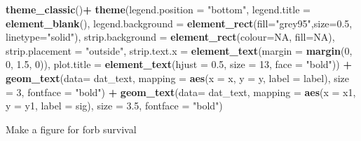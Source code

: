 \documentclass[
]{article}
\newenvironment{Shaded}{\begin{snugshade}}{\end{snugshade}}
\newcommand{\DataTypeTok}[1]{\textcolor[rgb]{0.13,0.29,0.53}{#1}}
\newcommand{\DecValTok}[1]{\textcolor[rgb]{0.00,0.00,0.81}{#1}}
\newcommand{\FloatTok}[1]{\textcolor[rgb]{0.00,0.00,0.81}{#1}}
\newcommand{\KeywordTok}[1]{\textcolor[rgb]{0.13,0.29,0.53}{\textbf{#1}}}
\newcommand{\NormalTok}[1]{#1}
\newcommand{\OperatorTok}[1]{\textcolor[rgb]{0.81,0.36,0.00}{\textbf{#1}}}
\newcommand{\OtherTok}[1]{\textcolor[rgb]{0.56,0.35,0.01}{#1}}
\newcommand{\StringTok}[1]{\textcolor[rgb]{0.31,0.60,0.02}{#1}}
\begin{document}
\begin{Shaded}
\begin{Highlighting}[]
\StringTok{  }\KeywordTok{theme\_classic}\NormalTok{()}\OperatorTok{+}
\StringTok{  }\KeywordTok{theme}\NormalTok{(}\DataTypeTok{legend.position =} \StringTok{"bottom"}\NormalTok{, }\DataTypeTok{legend.title =} \KeywordTok{element\_blank}\NormalTok{(), }\DataTypeTok{legend.background =} \KeywordTok{element\_rect}\NormalTok{(}\DataTypeTok{fill=}\StringTok{"grey95"}\NormalTok{,}\DataTypeTok{size=}\FloatTok{0.5}\NormalTok{, }\DataTypeTok{linetype=}\StringTok{"solid"}\NormalTok{), }\DataTypeTok{strip.background =} \KeywordTok{element\_rect}\NormalTok{(}\DataTypeTok{colour=}\OtherTok{NA}\NormalTok{, }\DataTypeTok{fill=}\OtherTok{NA}\NormalTok{), }\DataTypeTok{strip.placement =} \StringTok{"outside"}\NormalTok{, }\DataTypeTok{strip.text.x =} \KeywordTok{element\_text}\NormalTok{(}\DataTypeTok{margin =} \KeywordTok{margin}\NormalTok{(}\DecValTok{0}\NormalTok{, }\DecValTok{0}\NormalTok{, }\FloatTok{1.5}\NormalTok{, }\DecValTok{0}\NormalTok{)), }\DataTypeTok{plot.title =} \KeywordTok{element\_text}\NormalTok{(}\DataTypeTok{hjust =} \FloatTok{0.5}\NormalTok{, }\DataTypeTok{size =} \DecValTok{13}\NormalTok{, }\DataTypeTok{face =} \StringTok{"bold"}\NormalTok{)) }\OperatorTok{+}
\StringTok{  }\KeywordTok{geom\_text}\NormalTok{(}\DataTypeTok{data=}\NormalTok{ dat\_text, }\DataTypeTok{mapping =} \KeywordTok{aes}\NormalTok{(}\DataTypeTok{x =}\NormalTok{ x, }\DataTypeTok{y =}\NormalTok{ y, }\DataTypeTok{label =}\NormalTok{ label), }\DataTypeTok{size =} \DecValTok{3}\NormalTok{, }\DataTypeTok{fontface =} \StringTok{"bold"}\NormalTok{) }\OperatorTok{+}
\StringTok{  }\KeywordTok{geom\_text}\NormalTok{(}\DataTypeTok{data=}\NormalTok{ dat\_text, }\DataTypeTok{mapping =} \KeywordTok{aes}\NormalTok{(}\DataTypeTok{x =}\NormalTok{ x1, }\DataTypeTok{y =}\NormalTok{ y1, }\DataTypeTok{label =}\NormalTok{ sig), }\DataTypeTok{size =} \FloatTok{3.5}\NormalTok{, }\DataTypeTok{fontface =} \StringTok{"bold"}\NormalTok{)}
\end{Highlighting}
\end{Shaded}

Make a figure for forb survival
\end{document}

